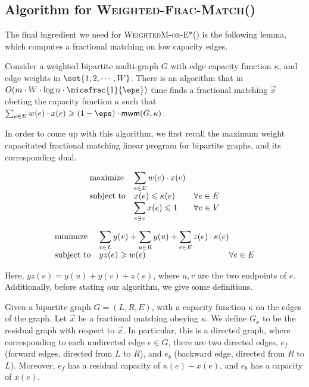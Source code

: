 \subsection{Algorithm for \textsc{Weighted-Frac-Match}()}

The final ingredient we need for \textsc{WeightedM-or-E*}() is the following lemma, which computes a fractional matching on low capacity edges.

\begin{lemma2}\label{lem:Hungarian2}
Consider a weighted bipartite multi-graph $G$ with edge capacity function $\kappa$, and edge weights in $\set{1,2,\cdots, W}$. There is an algorithm that in $O(m\cdot W\cdot \log n\cdot \nicefrac{1}{\eps})$ time finds a fractional matching $\vec{x}$ obeting the capacity function $\kappa$ such that $\sum_{e\in E}w(e)\cdot x(e)\geqslant (1-\eps)\cdot \textsf{mwm}(G,\kappa)$.
\end{lemma2}

In order to come up with this algorithm, we first recall the maximum weight capacitated fractional matching linear program for bipartite graphs, and its corresponding dual.

\begin{equation}
\begin{array}{ll@{}ll}
\text{maximize}  & \displaystyle\sum\limits_{e\in E} w(e)\cdot x(e)  \\
\text{subject to}& \displaystyle x(e)\leqslant \kappa(e)& & \forall e\in E \\
& \displaystyle \sum_{e\ni v} x(e) \leqslant 1 & & \forall v\in V
\end{array}
\end{equation}

\begin{equation}
\begin{array}{ll@{}ll}
\text{minimize}  & \displaystyle\sum\limits_{v\in L} y(v) +\sum\limits_{u\in R} y(u) +\sum_{e\in E} z(e)\cdot \kappa(e) &  \\
\text{subject to}& \displaystyle yz(e)\geqslant w(e) &  \forall e\in E 
\end{array}
\end{equation}

Here, $yz(e)=y(u)+y(v)+z(e)$, where $u,v$ are the two endpoints of $e$. Additionally, before stating our algorithm, we give some definitions.

\begin{definition2}
Given a bipartite graph $G=(L,R,E)$, with a capacity function $\kappa$ on the edges of the graph. Let $\vec{x}$ be a fractional matching obeying $\kappa$. We define $G_x$ to be the residual graph with respect to $\vec{x}$. In particular, this is a directed graph, where corresponding to each undirected edge $e\in G$, there are two directed edges, $e_f$ (forward edges, directed from $L$ to $R$), and $e_b$ (backward edge, directed from $R$ to $L$). Moreover, $e_f$ has a residual capacity of $\kappa(e)-x(e)$, and $e_b$ has a capacity of $x(e)$. 
\end{definition2}

